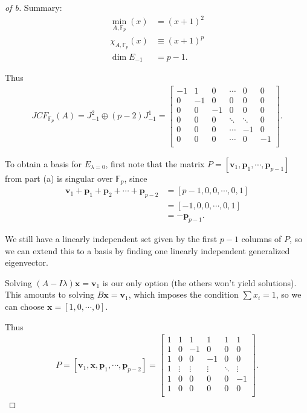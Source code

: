 \begin{solution}
\begin{proof}[of b]
Summary:
\begin{align*}
\min_{A, {\mathbb{F}}_p}(x) &= (x+1)^2 \\
\chi_{A, {\mathbb{F}}_p}(x) &\equiv (x+1)^p \\
\dim E_{-1} &= p-1
.\end{align*}

Thus
\begin{align*}
JCF_{{\mathbb{F}}_p}(A)
=  J_{-1}^{2} \oplus (p-2)J_{-1}^1
= \left[\begin{array}{rr|r|r|r|r}
-1 & 1 & 0 & \cdots & 0 & 0 \\
0& -1 & 0 & 0 & 0 & 0 \\
\hline
0& 0 & -1 & 0 & 0 & 0 \\ \hline
0& 0 & 0 & \ddots & \ddots & 0 \\ \hline
0& 0 & 0 & \cdots & -1 & 0 \\ \hline
0& 0 & 0 & \cdots & 0 & -1 \\
\end{array}\right]
.\end{align*}

To obtain a basis for \(E_{\lambda = 0}\), first note that the matrix
\(P = [\mathbf{v}_1, \mathbf{p}_1, \cdots , \mathbf{p}_{p-1}]\) from
part (a) is singular over \({\mathbb{F}}_p\), since
\begin{align*}
\mathbf{v}_1 + \mathbf{p}_1 + \mathbf{p}_2 + \cdots + \mathbf{p}_{p-2}
&= [p-1, 0, 0, \cdots, 0, 1] \\
&= [-1, 0,0,\cdots, 0, 1] \\
&= - \mathbf{p}_{p-1}
.\end{align*}

We still have a linearly independent set given by the first \(p-1\)
columns of \(P\), so we can extend this to a basis by finding one
linearly independent generalized eigenvector.

Solving \((A-I\lambda)\mathbf{x} = \mathbf{v}_1\) is our only option
(the others won't yield solutions). This amounts to solving
\(B\mathbf{x} = \mathbf{v}_1\), which imposes the condition
\(\sum x_i = 1\), so we can choose \(\mathbf{x} = [1, 0, \cdots, 0]\).

Thus
\begin{align*}
P = [\mathbf{v}_1, \mathbf{x}, \mathbf{p}_1, \cdots, \mathbf{p}_{p-2}] =
\left[\begin{array}{rrrrrr}
1 & 1 & 1 & 1 & 1 & 1  \\
1 & 0 & -1 & 0 & 0 & 0 \\
1 & 0 & 0 & -1 & 0 & 0 \\
1 & \vdots & \vdots & \vdots & \ddots & \vdots \\
1 & 0 & 0 & 0 & 0 & -1\\
1 & 0 & 0 & 0 & 0 & 0 \\
\end{array}\right]
.\end{align*}

\end{proof}

\end{solution}

